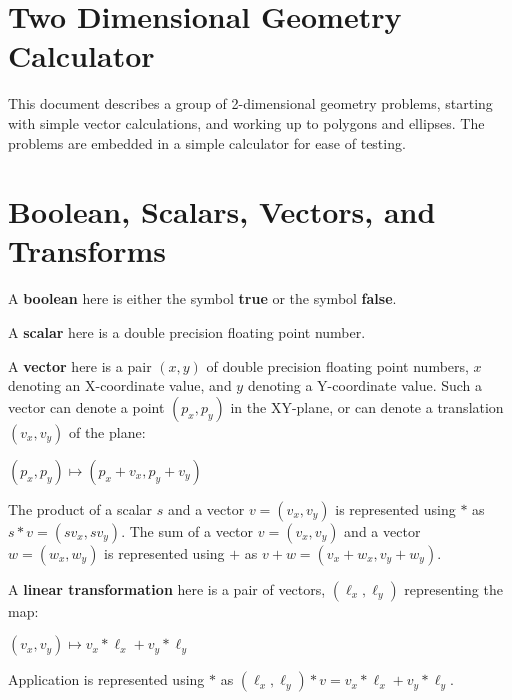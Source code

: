 \documentclass[12pt]{article}
\begin{document}
\newcommand{\header}[1]{\underline{\bf #1}}
\newcommand{\file}[1]{{\bf #1}}
\newcommand{\blankpage}{\newpage\vspace*{3.5in}%
    \centerline{\Large This Page is Intentionally Left Blank}}
\setlength{\parindent}{0.0in}
\setlength{\parskip}{1ex}
\newcommand{\key}[1]{{\bf #1}}
\newcommand{\TT}[1]{{\tt \bfseries #1}}
\newcommand{\EOL}{\penalty \exhyphenpenalty}
\newtheorem{definition}{Definition}[section]
\newtheorem{lemma}[definition]{Lemma}
\newenvironment{indpar}[1]%
    {\begin{list}{}{\setlength{\leftmargin}{#1}}\item[]}%
    {\end{list}}

\section{Two Dimensional Geometry Calculator}
This document describes a group of 2-dimensional geometry problems,
starting with simple vector calculations, and working up to polygons and
ellipses.
The problems are embedded in a simple calculator for ease of
testing.

\section{Boolean, Scalars, Vectors, and Transforms}
A \key{boolean} here is either the symbol \key{true} or the symbol \key{false}.

A \key{scalar} here is a double precision floating point number.

A \key{vector} here is a pair $(x,y)$ of double precision floating point
numbers, $x$ denoting an X-coordinate value, and $y$ denoting a
Y-coordinate value.  Such a vector can denote a point $(p_x,p_y)$ in the
XY-plane, or can denote a translation $(v_x,v_y)$ of the plane: \\
\centerline{$(p_x,p_y) \longmapsto (p_x+v_x,p_y+v_y)$}

The product of a scalar $s$ and a vector $v=(v_x,v_y)$ is represented using
$*$ as $s*v = (sv_x,sv_y)$.
The sum of a vector $v=(v_x,v_y)$ and a vector $w=(w_x,w_y)$ is
represented using $+$ as $v+w = (v_x+w_x,v_y+w_y)$.

A \key{linear transformation} here is a pair of vectors, $(\ell_x,\ell_y)$
representing the map:
\centerline{$(v_x,v_y) \longmapsto v_x*\ell_x+v_y*\ell_y$}
Application is represented using
$*$ as $(\ell_x,\ell_y)*v=v_x*\ell_x+v_y*\ell_y$.
\end{document}
